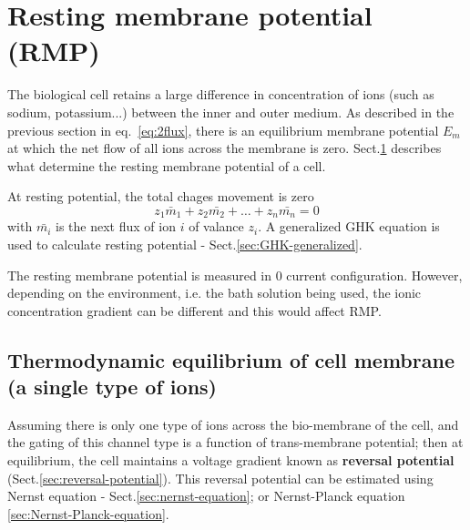 
\section{Resting membrane potential (RMP)}
\label{sec:resting-membrane-potential}
\label{sec:resting-potential}
\label{sec:RMP}
 
The biological cell retains a large difference in concentration of ions (such as
sodium, potassium...)  between the inner and outer medium.  As described in the
previous section in eq.~\eqref{eq:2flux}, there is an equilibrium membrane
potential $E_m$ at which the net flow of all ions across the membrane is zero.
Sect.\ref{sec:resting-membrane-potential} describes what determine the resting
membrane potential of a cell.

At resting potential, the total chages movement is zero
\begin{equation}
\label{eq:net-flux-balance}
z_1 \bar{m}_1 + z_2 \bar{m_2} + \ldots + z_n \bar{m_n} = 0
\end{equation}
with $\bar{m_i}$ is the next flux of ion $i$ of valance $z_i$.
A generalized GHK equation is used to calculate resting potential -
Sect.\ref{sec:GHK-generalized}.

The resting membrane potential is measured in 0 current configuration.
However, depending on the environment, i.e. the bath solution being used, the
ionic concentration gradient can be different and this would affect RMP.

\subsection[Single type of ion channels]{Thermodynamic equilibrium of cell membrane (a single type
  of ions)}
\label{sec:therm-equil-cell}

Assuming there is only one type of ions across the bio-membrane of the cell, and
the gating of this channel type is a function of trans-membrane potential; then
at equilibrium, the cell maintains a voltage gradient known as {\bf reversal
potential} (Sect.\ref{sec:reversal-potential}).
This reversal potential can be estimated using
Nernst equation -
Sect.\ref{sec:nernst-equation}; or Nernst-Planck
equation \ref{sec:Nernst-Planck-equation}.


